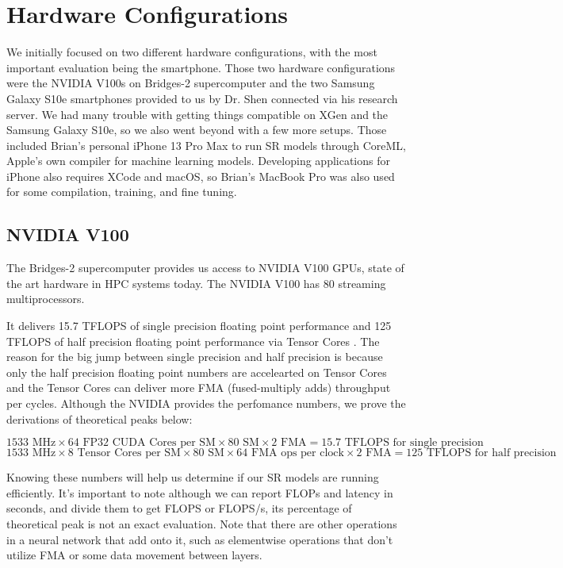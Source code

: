\documentclass{article}
\begin{document}
\section{Hardware Configurations}
We initially focused on two different hardware configurations, with the most important evaluation being the smartphone. Those two hardware configurations were the NVIDIA V100s on Bridges-2 supercomputer \cite{bridges-2} and the two Samsung Galaxy S10e smartphones provided to us by Dr. Shen connected via his research server. We had many trouble with getting things compatible on XGen and the Samsung Galaxy S10e, so we also went beyond with a few more setups. Those included Brian's personal iPhone 13 Pro Max to run SR models through CoreML, Apple's own compiler for machine learning models. Developing applications for iPhone also requires XCode and macOS, so Brian's MacBook Pro was also used for some compilation, training, and fine tuning. 

\subsection{NVIDIA V100}
The Bridges-2 supercomputer provides us access to NVIDIA V100 GPUs, state of the art hardware in HPC systems today. The NVIDIA V100 has 80 streaming multiprocessors.

It delivers 15.7 TFLOPS of single precision floating point performance and 125 TFLOPS of half precision floating point performance via Tensor Cores \cite{v100}. The reason for the big jump between single precision and half precision is because only the half precision floating point numbers are accelearted on Tensor Cores and the Tensor Cores can deliver more FMA (fused-multiply adds) throughput per cycles. Although the NVIDIA provides the perfomance numbers, we prove the derivations of theoretical peaks below:

$$1533 \text{ MHz} \times 64 \text{ FP32 CUDA Cores per SM} \times 80 \text{ SM} \times 2 \text{ FMA} = 15.7 \text{ TFLOPS for single precision}$$
$$1533 \text{ MHz} \times 8 \text{ Tensor Cores per SM} \times 80 \text{ SM} \times 64 \text{ FMA ops per clock} \times 2 \text{ FMA} = 125 \text{ TFLOPS for half precision}$$

Knowing these numbers will help us determine if our SR models are running efficiently. It's important to note although we can report FLOPs and latency in seconds, and divide them to get FLOPS or FLOPS/s, its percentage of theoretical peak is not an exact evaluation. Note that there are other operations in a neural network that add onto it, such as elementwise operations that don't utilize FMA or some data movement between layers.
\end{document}
